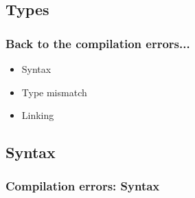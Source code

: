 \documentclass[t]{myBeamer}
\begin{document}
\subsection{Types} 

\begin{frame}[t]
\frametitle{ \huge Back to the compilation errors...}
\Huge
  \begin{center}
    \begin{minipage}{0.6\textwidth}
      \begin{tightBox}
	  \begin{itemize}
	    \item Syntax
	    \item Type mismatch
	    \item Linking
	  \end{itemize}
      \end{tightBox}
    \end{minipage}
    \end{center}
\end{frame}

 
\subsection{Syntax} 
\begin{frame}[t]

\frametitle{ \huge Compilation errors: \textbf{Syntax} }
\Large
{}

\end{frame}
\end{document}
